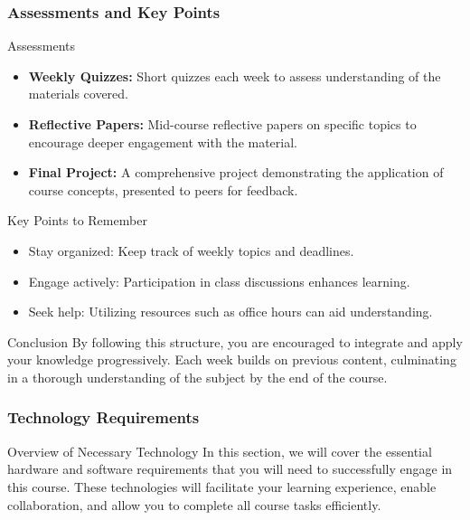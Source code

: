 \documentclass[aspectratio=169]{beamer}
\begin{document}
\begin{frame}[fragile]
    \frametitle{Assessments and Key Points}
    \begin{block}{Assessments}
        \begin{itemize}
            \item \textbf{Weekly Quizzes:} Short quizzes each week to assess understanding of the materials covered.
            \item \textbf{Reflective Papers:} Mid-course reflective papers on specific topics to encourage deeper engagement with the material.
            \item \textbf{Final Project:} A comprehensive project demonstrating the application of course concepts, presented to peers for feedback.
        \end{itemize}
    \end{block}

    \begin{block}{Key Points to Remember}
        \begin{itemize}
            \item Stay organized: Keep track of weekly topics and deadlines.
            \item Engage actively: Participation in class discussions enhances learning.
            \item Seek help: Utilizing resources such as office hours can aid understanding.
        \end{itemize}
    \end{block}
    
    \begin{block}{Conclusion}
        By following this structure, you are encouraged to integrate and apply your knowledge progressively. 
        Each week builds on previous content, culminating in a thorough understanding of the subject by the end of the course.
    \end{block}
\end{frame}

\begin{frame}[fragile]
    \frametitle{Technology Requirements}
    \begin{block}{Overview of Necessary Technology}
        In this section, we will cover the essential hardware and software requirements that you will need to successfully engage in this course. These technologies will facilitate your learning experience, enable collaboration, and allow you to complete all course tasks efficiently.
    \end{block}
\end{frame}
\end{document}
